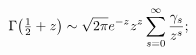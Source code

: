 \[\mathop{\Gamma\/}\nolimits\!\left(\tfrac{1}{2}+z\right)\sim\sqrt{2\pi}e^{-z}z^%
{z}\sum_{s=0}^{\infty}\frac{\gamma_{s}}{z^{s}};\]